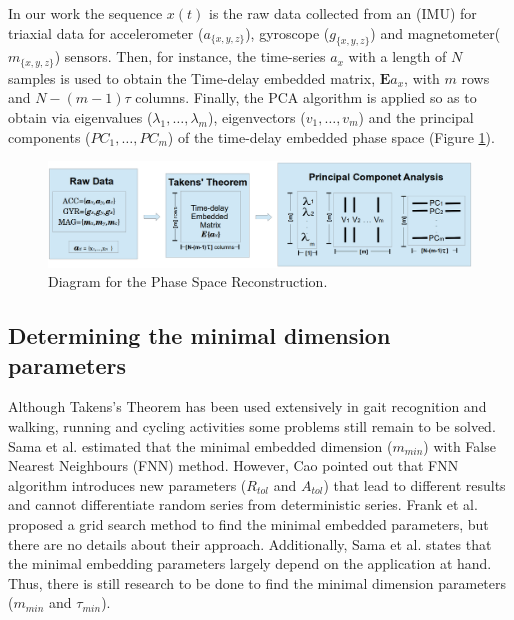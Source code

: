 \documentclass{sigchi}
\begin{document}
In our work the sequence $x(t)$ is the raw data collected from an (IMU)
for triaxial data for accelerometer ($a_{ \{ x,y,z \} }$), gyroscope ($g_{ \{ x,y,z \} }$) and magnetometer($m_{ \{ x,y,z \} }$) sensors. 
Then, for instance, the time-series $a_x$ with a length of 
$N$ samples is used to obtain the Time-delay embedded matrix, 
$\boldsymbol{E} a_{x}$, with $m$ rows and $N-(m-1)\tau$ columns. 
Finally, the PCA algorithm is applied so as to obtain via eigenvalues 
($\lambda_1,\ldots,\lambda_m$), eigenvectors ($v_1,\ldots,v_m$) and the principal components 
($PC_1,\ldots,PC_m$) of the time-delay embedded phase space (Figure \ref{fig:raw_takens_pca}).
\begin{figure}[!ht]
\centering    
\includegraphics[width=\textwidth]{diagram_v9}
\caption[PA]{Diagram for the Phase Space Reconstruction.}
\label{fig:raw_takens_pca}
\end{figure}


\subsection{Determining the minimal dimension parameters}
Although Takens's Theorem has been used extensively in gait recognition \cite{Sama2013} 
and walking, running and cycling activities \cite{Frank2010} some problems still remain to be solved.
Sama et al. \cite{Sama2013} estimated that the minimal embedded dimension ($m_{min}$) with False Nearest Neighbours (FNN) method.
However, Cao \cite{Cao1997} pointed out that FNN algorithm 
introduces new parameters ($R_{tol}$ and $A_{tol}$) that lead 
to different results and  cannot differentiate random series from deterministic series. 
Frank et al. \cite{Frank2010} proposed a grid search method to find the minimal embedded parameters, but there are no details about their approach.
Additionally, Sama et al. \cite{Sama2013} states that the minimal embedding parameters largely depend on the 
application at hand. Thus, there is still research to be done to find the minimal dimension parameters ($m_{min}$ and $\tau_{min}$).

\end{document}
